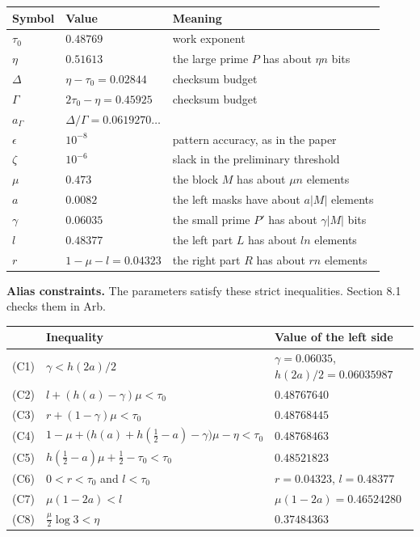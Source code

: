 \documentclass[10pt,a4paper]{article}
\begin{document}
{\small
\begin{longtable}{>{\raggedright\arraybackslash}p{0.090\dimexpr\linewidth-6\tabcolsep\relax}>{\raggedright\arraybackslash}p{0.239\dimexpr\linewidth-6\tabcolsep\relax}>{\raggedright\arraybackslash}p{0.672\dimexpr\linewidth-6\tabcolsep\relax}}
\hline
\textbf{Symbol} & \textbf{Value} & \textbf{Meaning} \\ \hline
\endhead
$\tau_0$ & $0.48769$ & work exponent \\
$\eta$ & $0.51613$ & the large prime $P$ has about $\eta n$ bits \\
$\Delta$ & $\eta - \tau_0 = 0.02844$ & checksum budget \\
$\Gamma$ & $2\tau_0 - \eta = 0.45925$ & checksum budget \\
$a_\Gamma$ & $\Delta/\Gamma = 0.0619270\ldots$ &  \\
$\epsilon$ & $10^{-8}$ & pattern accuracy, as in the paper \\
$\zeta$ & $10^{-6}$ & slack in the preliminary threshold \\
$\mu$ & $0.473$ & the block $M$ has about $\mu n$ elements \\
$a$ & $0.0082$ & the left masks have about $a\lvert M\rvert$ elements \\
$\gamma$ & $0.06035$ & the small prime $P'$ has about $\gamma\lvert M\rvert$ bits \\
$l$ & $0.48377$ & the left part $L$ has about $ln$ elements \\
$r$ & $1 - \mu - l = 0.04323$ & the right part $R$ has about $rn$ elements \\
\hline
\end{longtable}}

\textbf{Alias constraints.} The parameters satisfy these strict inequalities. Section 8.1 checks them in Arb.

{\small
\begin{longtable}{>{\raggedright\arraybackslash}p{0.094\dimexpr\linewidth-6\tabcolsep\relax}>{\raggedright\arraybackslash}p{0.562\dimexpr\linewidth-6\tabcolsep\relax}>{\raggedright\arraybackslash}p{0.344\dimexpr\linewidth-6\tabcolsep\relax}}
\hline
 & \textbf{Inequality} & \textbf{Value of the left side} \\ \hline
\endhead
(C1) & $\gamma < h(2a)/2$ & $\gamma = 0.06035$, $h(2a)/2 = 0.06035987$ \\
(C2) & $l + (h(a) - \gamma)\mu < \tau_0$ & $0.48767640$ \\
(C3) & $r + (1 - \gamma)\mu < \tau_0$ & $0.48768445$ \\
(C4) & $1 - \mu + \big(h(a) + h(\tfrac12 - a) - \gamma\big)\mu - \eta < \tau_0$ & $0.48768463$ \\
(C5) & $h(\tfrac12 - a)\mu + \tfrac12 - \tau_0 < \tau_0$ & $0.48521823$ \\
(C6) & $0 < r < \tau_0$ and $l < \tau_0$ & $r = 0.04323$, $l = 0.48377$ \\
(C7) & $\mu(1 - 2a) < l$ & $\mu(1-2a) = 0.46524280$ \\
(C8) & $\tfrac{\mu}{2}\log 3 < \eta$ & $0.37484363$ \\
\hline
\end{longtable}}
\end{document}
